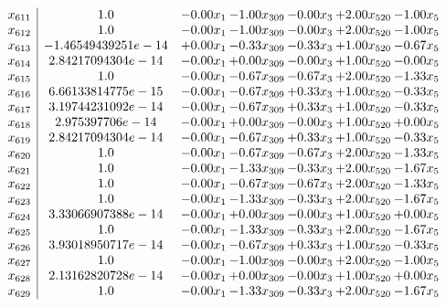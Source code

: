 \documentclass[8pt]{article}
\begin{document}
\[\begin{array}{c| c c@{\hskip 2pt} c@{\hskip 2pt} c@{\hskip 2pt} c@{\hskip 2pt} c@{\hskip 2pt} }
 x_{611}   &  1.0 & -0.00 x_{1} & -1.00 x_{309} & -0.00 x_{3} & +  2.00 x_{520} & -1.00 x_{5}\\
 x_{612}   &  1.0 & -0.00 x_{1} & -1.00 x_{309} & -0.00 x_{3} & +  2.00 x_{520} & -1.00 x_{5}\\
 x_{613}   &  -1.46549439251e-14 & +  0.00 x_{1} & -0.33 x_{309} & -0.33 x_{3} & +  1.00 x_{520} & -0.67 x_{5}\\
 x_{614}   &  2.84217094304e-14 & -0.00 x_{1} & +  0.00 x_{309} & -0.00 x_{3} & +  1.00 x_{520} & -0.00 x_{5}\\
 x_{615}   &  1.0 & -0.00 x_{1} & -0.67 x_{309} & -0.67 x_{3} & +  2.00 x_{520} & -1.33 x_{5}\\
 x_{616}   &  6.66133814775e-15 & -0.00 x_{1} & -0.67 x_{309} & +  0.33 x_{3} & +  1.00 x_{520} & -0.33 x_{5}\\
 x_{617}   &  3.19744231092e-14 & -0.00 x_{1} & -0.67 x_{309} & +  0.33 x_{3} & +  1.00 x_{520} & -0.33 x_{5}\\
 x_{618}   &  2.975397706e-14 & -0.00 x_{1} & +  0.00 x_{309} & -0.00 x_{3} & +  1.00 x_{520} & +  0.00 x_{5}\\
 x_{619}   &  2.84217094304e-14 & -0.00 x_{1} & -0.67 x_{309} & +  0.33 x_{3} & +  1.00 x_{520} & -0.33 x_{5}\\
 x_{620}   &  1.0 & -0.00 x_{1} & -0.67 x_{309} & -0.67 x_{3} & +  2.00 x_{520} & -1.33 x_{5}\\
 x_{621}   &  1.0 & -0.00 x_{1} & -1.33 x_{309} & -0.33 x_{3} & +  2.00 x_{520} & -1.67 x_{5}\\
 x_{622}   &  1.0 & -0.00 x_{1} & -0.67 x_{309} & -0.67 x_{3} & +  2.00 x_{520} & -1.33 x_{5}\\
 x_{623}   &  1.0 & -0.00 x_{1} & -1.33 x_{309} & -0.33 x_{3} & +  2.00 x_{520} & -1.67 x_{5}\\
 x_{624}   &  3.33066907388e-14 & -0.00 x_{1} & +  0.00 x_{309} & -0.00 x_{3} & +  1.00 x_{520} & +  0.00 x_{5}\\
 x_{625}   &  1.0 & -0.00 x_{1} & -1.33 x_{309} & -0.33 x_{3} & +  2.00 x_{520} & -1.67 x_{5}\\
 x_{626}   &  3.93018950717e-14 & -0.00 x_{1} & -0.67 x_{309} & +  0.33 x_{3} & +  1.00 x_{520} & -0.33 x_{5}\\
 x_{627}   &  1.0 & -0.00 x_{1} & -1.00 x_{309} & -0.00 x_{3} & +  2.00 x_{520} & -1.00 x_{5}\\
 x_{628}   &  2.13162820728e-14 & -0.00 x_{1} & +  0.00 x_{309} & -0.00 x_{3} & +  1.00 x_{520} & +  0.00 x_{5}\\
 x_{629}   &  1.0 & -0.00 x_{1} & -1.33 x_{309} & -0.33 x_{3} & +  2.00 x_{520} & -1.67 x_{5}\\

\end{array}\]
\end{document}
